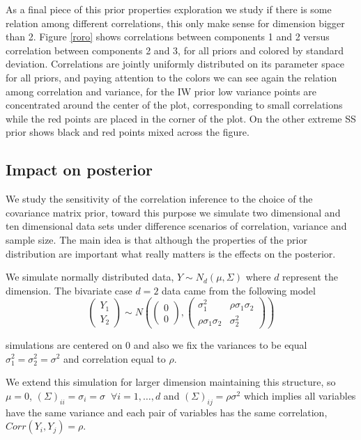 \documentclass{article}
\begin{document}
As a final piece of this prior properties exploration we study if there is some relation among different correlations, this only make sense for dimension bigger than 2. Figure \ref{roro} shows correlations between components 1 and 2 versus correlation between components 2 and 3, for all priors and colored by standard deviation. Correlations are jointly uniformly distributed on its parameter space for all priors, and paying attention to the colors we can see again the relation among correlation and variance, for the IW prior low variance points are concentrated around the center of the plot, corresponding to small correlations while the red points are placed in the corner of the plot. On the other extreme SS prior shows black and red points mixed across the figure. 


\subsection{Impact on posterior} 

We study the sensitivity of the correlation inference to the choice of the covariance matrix prior, toward this purpose we simulate two dimensional and ten dimensional data sets under difference scenarios of correlation, variance and sample size. The main idea is that although the properties of the prior distribution are important what really matters is the effects on the posterior.

We simulate normally distributed data, $Y \sim N_d(\mu, \Sigma) $ where $d$ represent the dimension. The bivariate case $d=2$ data came from the following model 
\begin{equation}
\begin{pmatrix}  Y_1 \\ Y_2 \end{pmatrix} \sim 
N\left( \begin{pmatrix}  0 \\ 0 \end{pmatrix}, \begin{pmatrix}  \sigma_{1}^2 & \rho\sigma_{1}\sigma_{2} \\ \rho\sigma_{1}\sigma_{2} & \sigma_{2}^2 \end{pmatrix} \right)
\label{modsim}
\end{equation} 

simulations are centered on 0 and also we fix the variances to be equal $\sigma_{1}^2=\sigma_{2}^2=\sigma^2$ and correlation equal to $\rho$. 

We extend this simulation for larger dimension maintaining this structure, so $\mu= 0$, $(\Sigma)_{ii} = \sigma_{i}=\sigma \;\; \forall i=1,\ldots,d$ and $(\Sigma)_{ij} = \rho\sigma^2$ which implies all variables have the same variance and each pair of variables has the same correlation, $Corr(Y_{i}, Y_{j}) = \rho$. 
\end{document}
